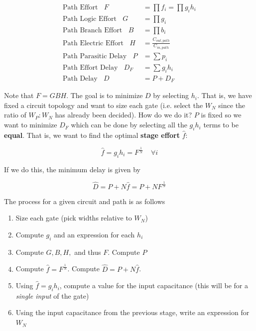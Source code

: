 \documentclass[11pt]{report}
\begin{document}
\begin{align}
	\text{Path Effort} \ \ \ \ F &= \prod f_i = \prod g_ih_i\\
	\text{Path Logic Effort} \ \ \ \ G &= \prod g_i\\
	\text{Path Branch Effort} \ \ \ \ B &= \prod b_i\\
	\text{Path Electric Effort} \ \ \ \ H &= \frac{C_{out, path}}{C_{in, path}}\\
	\text{Path Parasitic Delay} \ \ \ \ P &= \sum p_i\\
	\text{Path Effort Delay} \ \ \ \ D_F &= \sum g_ih_i\\
	\label{eqn:overall-delay}
	\text{Path Delay} \ \ \ \ D &= P + D_F
\end{align}

Note that $F = GBH$. The goal is to minimize $D$ by selecting $h_i$. That is, we have fixed a circuit topology and want to size each gate (i.e. select the $W_N$ since the ratio of $W_P:W_N$ has already been decided). How do we do it? $P$ is fixed so we want to minimize $D_F$ which can be done by selecting all the $g_ih_i$ terms to be \textbf{equal}. That is, we want to find the optimal \textbf{stage effort} $\hat{f}$:

\begin{equation}
	\hat{f} = g_ih_i = F^{\frac{1}{N}}	\ \ \ \  \ \forall i
\end{equation}

If we do this, the minimum delay is given by

\begin{equation}
	\hat{D} = P + N\hat{f} = P + NF^{\frac{1}{N}}
\end{equation}

The process for a given circuit and path is as follows

\begin{enumerate}
	\item Size each gate (pick widths relative to $W_N$)
	\item Compute $g_i$ and an expression for each $h_i$
	\item Compute $G, B, H,$ and thus $F$. Compute $P$
	\item Compute $\hat{f} = F^{\frac{1}{N}}$. Compute $\hat{D} = P + N\hat{f}$.
	\item Using $\hat{f} = g_ih_i$, compute a value for the input capacitance (this will be for a \textit{single input} of the gate)
	\item Using the input capacitance from the previous stage, write an expression for $W_N$
\end{enumerate}
\end{document}
